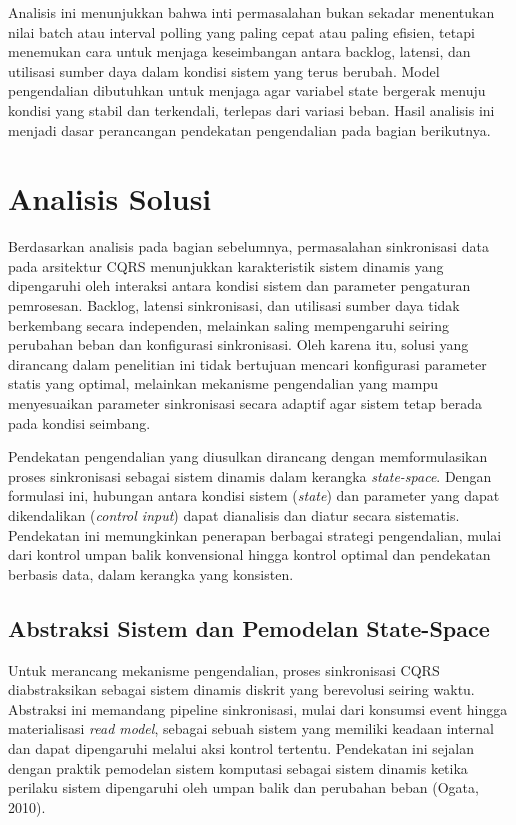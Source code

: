Analisis ini menunjukkan bahwa inti permasalahan bukan sekadar menentukan nilai batch atau interval polling yang paling cepat atau paling efisien, tetapi menemukan cara untuk menjaga keseimbangan antara backlog, latensi, dan utilisasi sumber daya dalam kondisi sistem yang terus berubah.
Model pengendalian dibutuhkan untuk menjaga agar variabel state bergerak menuju kondisi yang stabil dan terkendali, terlepas dari variasi beban.
Hasil analisis ini menjadi dasar perancangan pendekatan pengendalian pada bagian berikutnya.

\section{Analisis Solusi}

Berdasarkan analisis pada bagian sebelumnya, permasalahan sinkronisasi data pada arsitektur CQRS menunjukkan karakteristik sistem dinamis yang dipengaruhi oleh interaksi antara kondisi sistem dan parameter pengaturan pemrosesan.
Backlog, latensi sinkronisasi, dan utilisasi sumber daya tidak berkembang secara independen, melainkan saling mempengaruhi seiring perubahan beban dan konfigurasi sinkronisasi.
Oleh karena itu, solusi yang dirancang dalam penelitian ini tidak bertujuan mencari konfigurasi parameter statis yang optimal, melainkan mekanisme pengendalian yang mampu menyesuaikan parameter sinkronisasi secara adaptif agar sistem tetap berada pada kondisi seimbang.

Pendekatan pengendalian yang diusulkan dirancang dengan memformulasikan proses sinkronisasi sebagai sistem dinamis dalam kerangka \emph{state-space}.
Dengan formulasi ini, hubungan antara kondisi sistem (\emph{state}) dan parameter yang dapat dikendalikan (\emph{control input}) dapat dianalisis dan diatur secara sistematis.
Pendekatan ini memungkinkan penerapan berbagai strategi pengendalian, mulai dari kontrol umpan balik konvensional hingga kontrol optimal dan pendekatan berbasis data, dalam kerangka yang konsisten.

\subsection{Abstraksi Sistem dan Pemodelan State-Space}

Untuk merancang mekanisme pengendalian, proses sinkronisasi CQRS diabstraksikan sebagai sistem dinamis diskrit yang berevolusi seiring waktu.
Abstraksi ini memandang pipeline sinkronisasi, mulai dari konsumsi event hingga materialisasi \emph{read model}, sebagai sebuah sistem yang memiliki keadaan internal dan dapat dipengaruhi melalui aksi kontrol tertentu.
Pendekatan ini sejalan dengan praktik pemodelan sistem komputasi sebagai sistem dinamis ketika perilaku sistem dipengaruhi oleh umpan balik dan perubahan beban (Ogata, 2010).

